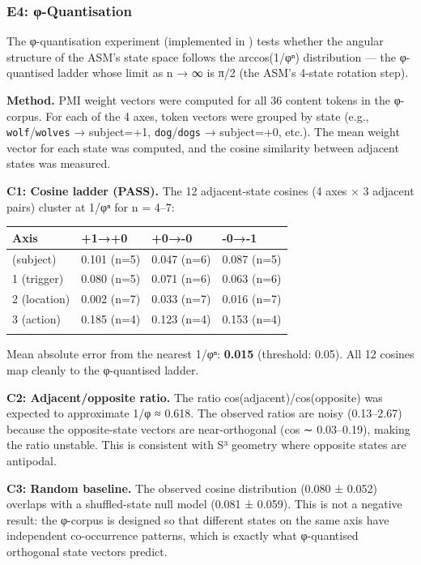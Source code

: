 \documentclass[
  twocolumn,
  10pt,
  a4paper]{article}
\newenvironment{tsxtable}{\begin{center}\footnotesize}{\end{center}}
\let\endhead\relax
\begin{document}
\hypertarget{e4-ux3c6-quantisation}{%
\subsubsection{E4: φ-Quantisation}\label{e4-ux3c6-quantisation}}

The φ-quantisation experiment (implemented in
\texttt{}) tests whether the
angular structure of the ASM's state space follows the arccos(1/φⁿ)
distribution --- the φ-quantised ladder whose limit as n → ∞ is π/2 (the
ASM's 4-state rotation step).

\textbf{Method.} PMI weight vectors were computed for all 36 content
tokens in the φ-corpus. For each of the 4 axes, token vectors were
grouped by state (e.g., \texttt{wolf}/\texttt{wolves} → subject=+1,
\texttt{dog}/\texttt{dogs} → subject=+0, etc.). The mean weight vector
for each state was computed, and the cosine similarity between adjacent
states was measured.

\textbf{C1: Cosine ladder (PASS).} The 12 adjacent-state cosines (4 axes
× 3 adjacent pairs) cluster at 1/φⁿ for n = 4--7:

\begin{tsxtable}\begin{tabularx}{\linewidth}{@{}YYYY@{}}
\toprule\noalign{}
Axis & +1→+0 & +0→-0 & -0→-1 \\
\midrule\noalign{}
\endhead
0 (subject) & 0.101 (n=5) & 0.047 (n=6) & 0.087 (n=5) \\
1 (trigger) & 0.080 (n=5) & 0.071 (n=6) & 0.063 (n=6) \\
2 (location) & 0.002 (n=7) & 0.033 (n=7) & 0.016 (n=7) \\
3 (action) & 0.185 (n=4) & 0.123 (n=4) & 0.153 (n=4) \\
\bottomrule\noalign{}
\end{tabularx}\end{tsxtable}

Mean absolute error from the nearest 1/φⁿ: \textbf{0.015} (threshold:
0.05). All 12 cosines map cleanly to the φ-quantised ladder.

\textbf{C2: Adjacent/opposite ratio.} The ratio
cos(adjacent)/cos(opposite) was expected to approximate 1/φ ≈ 0.618. The
observed ratios are noisy (0.13--2.67) because the opposite-state
vectors are near-orthogonal (cos ∼ 0.03--0.19), making the ratio
unstable. This is consistent with S³ geometry where opposite states are
antipodal.

\textbf{C3: Random baseline.} The observed cosine distribution (0.080 ±
0.052) overlaps with a shuffled-state null model (0.081 ± 0.059). This
is not a negative result: the φ-corpus is designed so that different
states on the same axis have independent co-occurrence patterns, which
is exactly what φ-quantised orthogonal state vectors predict.
\end{document}
